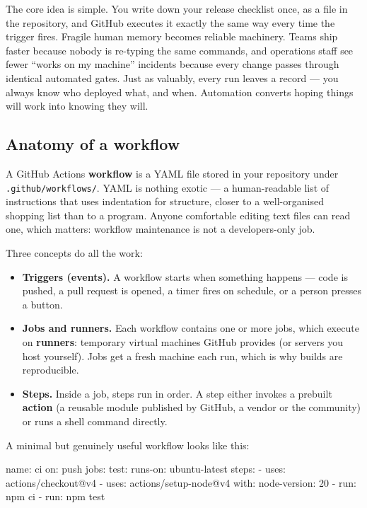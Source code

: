 The core idea is simple. You write down your release checklist once, as a file in the repository, and GitHub executes it exactly the same way every time the trigger fires. Fragile human memory becomes reliable machinery. Teams ship faster because nobody is re-typing the same commands, and operations staff see fewer ``works on my machine'' incidents because every change passes through identical automated gates. Just as valuably, every run leaves a record — you always know who deployed what, and when. Automation converts hoping things will work into knowing they will.



\subsection{Anatomy of a workflow}


A GitHub Actions \textbf{workflow} is a YAML file stored in your repository under \texttt{.github/workflows/}. YAML is nothing exotic — a human-readable list of instructions that uses indentation for structure, closer to a well-organised shopping list than to a program. Anyone comfortable editing text files can read one, which matters: workflow maintenance is not a developers-only job.


Three concepts do all the work:


\begin{itemize}[leftmargin=*]
\item \textbf{Triggers (events).} A workflow starts when something happens — code is pushed, a pull request is opened, a timer fires on schedule, or a person presses a button.
\item \textbf{Jobs and runners.} Each workflow contains one or more jobs, which execute on \textbf{runners}: temporary virtual machines GitHub provides (or servers you host yourself). Jobs get a fresh machine each run, which is why builds are reproducible.
\item \textbf{Steps.} Inside a job, steps run in order. A step either invokes a prebuilt \textbf{action} (a reusable module published by GitHub, a vendor or the community) or runs a shell command directly.
\end{itemize}

A minimal but genuinely useful workflow looks like this:



\begin{CodeBlock}
name: ci
on: push
jobs:
  test:
    runs-on: ubuntu-latest
    steps:
      - uses: actions/checkout@v4
      - uses: actions/setup-node@v4
        with:
          node-version: 20
      - run: npm ci
      - run: npm test
\end{CodeBlock}


